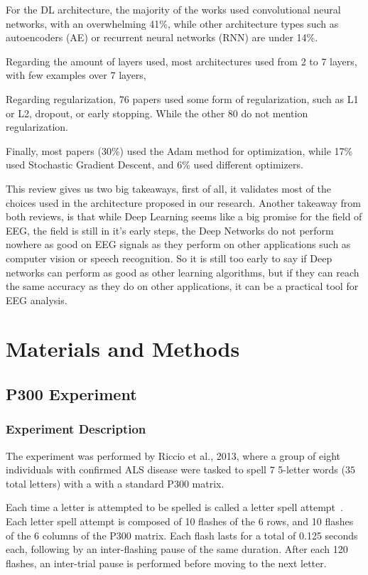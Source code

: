 \documentclass[conference]{IEEEtran}
\begin{document}
For the DL architecture, the majority of the works used convolutional neural networks, with an overwhelming 41\%, while other architecture types such as autoencoders (AE) or recurrent neural networks (RNN) are under 14\%.

Regarding the amount of layers used, most architectures used from 2 to 7 layers, with  few examples over 7 layers,

Regarding regularization, 76 papers used some form of regularization, such as L1 or L2, dropout, or early stopping. While the other 80 do not mention regularization.

Finally, most papers (30\%) used the Adam method for optimization, while 17\% used Stochastic Gradient Descent, and 6\% used different optimizers.

This review gives us two big takeaways, first of all, it validates most of the choices used in the architecture proposed in our research. 
Another takeaway from both reviews, is that while Deep Learning seems like a big promise for the field of EEG, the field is still in it's early steps, the Deep Networks do not perform nowhere as good on EEG signals as they perform on other applications such as computer vision  or speech recognition. So it is still too early to say if Deep networks can perform as good as other learning algorithms, but if they can reach the same accuracy as they do on other applications, it can be a practical tool for EEG analysis.


\section{Materials and Methods}

\subsection{P300 Experiment}
\subsubsection{Experiment Description}
The experiment was performed by Riccio et al., 2013\cite{riccio2013}, where a group of eight individuals with confirmed ALS disease were tasked to spell $7$ 5-letter words ($35$ total letters) with a with a standard P300 matrix.  

Each time a letter is attempted to be spelled is called a letter spell attempt~\cite{Antonietti.etal2021}. Each letter spell attempt is composed of 10 flashes of the 6 rows, and 10 flashes of the 6 columns of the P300 matrix. Each flash lasts for a total of 0.125 seconds each, following by an inter-flashing pause of the same duration. After each 120 flashes, an inter-trial pause is performed before moving to the next letter.
\end{document}
